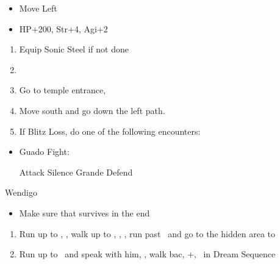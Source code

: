 \begin{spheregrid}
\begin{itemize}
	\tidusf
	\begin{itemize}
		\item Move Left
		\item HP+200, Str+4, Agi+2
	\end{itemize}
\end{itemize}
\end{spheregrid}
\begin{enumerate}[resume]
	\item Equip Sonic Steel if not done
	\item \formation{\tidus}{\rikku}{\yuna}
	\item Go to temple entrance, \sd
	\item Move south and go down the left path.
	\item If Blitz Loss, do one of the following encounters:
\end{enumerate}
\begin{encounters}
\begin{itemize}
	\item Guado Fight:
	\begin{itemize}
		\tidusf Attack
		\rikkuf Silence Grande
		\yunaf Defend
	\end{itemize}
\end{itemize}
\end{encounters}
\begin{battle}[18000]{Wendigo}
\begin{itemize}
	\tidusf Haste \tidus
	\tidusf Switch Weapon to Brotherhood
	\tidusf Attack Guado B
	\rikkuf Light Curtain \tidus
	\tidusf Attack Wendigo
	\yunaf Defend/Heal \tidus/Phoenix Down Dead Ally
	\rikkuf Defend/Heal \tidus/Steal Guado/Phoenix Down Dead Ally
	\item Make sure that \yuna survives in the end
\end{itemize}
\end{battle}
\begin{enumerate}[resume]
	\item Run up to \rikku, \sd, walk up to \yuna, \sd, \save, run past \kimahri\ and go to the hidden area to 
	\item Run up to \auron\ and speak with him, \sd, walk bac, \cs+\skippablefmv[1:00], \sd\ in Dream Sequence
\end{enumerate}

